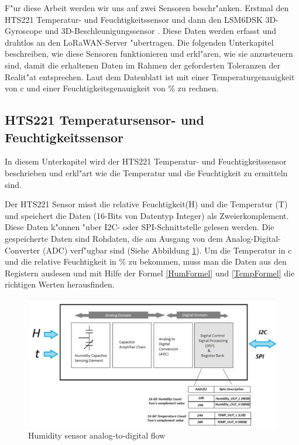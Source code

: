 \vspace{3cm}

F"ur diese Arbeit werden wir uns auf zwei Sensoren beschr"anken. Erstmal den HTS221\cite{HTS221} Temperatur- und Feuchtigkeitssensor und dann den LSM6DSK 3D-Gyroscope und 3D-Beschleunigungssensor \cite{LSM6DSL}. Diese Daten werden erfasst und drahtlos an den LoRaWAN-Server "ubertragen. Die folgenden Unterkapitel beschreiben, wie diese Sensoren funktionieren und erkl"aren, wie sie anzusteuern sind, damit die erhaltenen Daten im Rahmen der geforderten Toleranzen der Realit"at entsprechen. Laut dem Datenblatt ist mit einer Temperaturgenauigkeit von \textdegree{}c und einer Feuchtigkeitsgenauigkeit von \%   zu rechnen. 

\subsection {HTS221 Temperatursensor- und Feuchtigkeitssensor}\label{Temp}
In diesem Unterkapitel wird der HTS221 Temperatur- und Feuchtigkeitssensor beschrieben und erkl"art wie die Temperatur und die Feuchtigkeit zu ermitteln sind.

Der HTS221 Sensor misst die relative Feuchtigkeit(H) und die Temperatur (T) und speichert die Daten (16-Bits von Datentyp Integer) als Zweierkomplement. Diese Daten k"onnen "uber I2C- oder SPI-Schnittstelle gelesen werden. Die gespeicherte Daten sind Rohdaten, die am Ausgang von dem Analog-Digital-Converter (ADC) verf"ugbar sind (Siehe Abbildung \ref{HT_sensor}). Um die Temperatur in \textdegree{}c und die relative Feuchtigkeit in \% zu bekommen, muss man die Daten aus den Registern auslesen und mit Hilfe der Formel \ref{HumFormel} und \ref{TempFormel} die richtigen Werten herausfinden.

\begin{figure}[h]
	\centering
	\includegraphics[width=14cm]{source/images/HTS221_sensor}
	\caption{Humidity sensor analog-to-digital flow \cite{HTS221}}\label{HT_sensor}
\end{figure}

